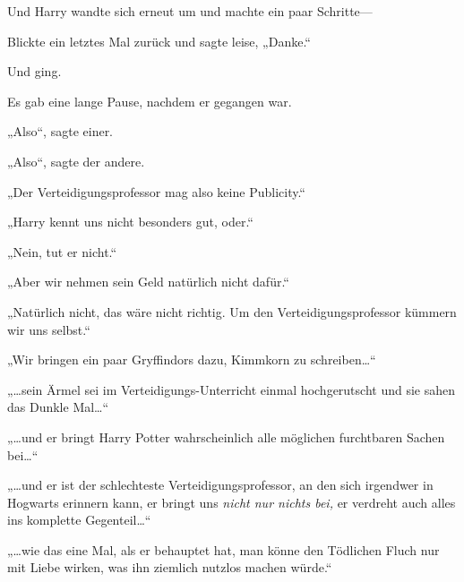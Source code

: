Und Harry wandte sich erneut um und machte ein paar Schritte—

Blickte ein letztes Mal zurück und sagte leise, „Danke.“

Und ging.

Es gab eine lange Pause, nachdem er gegangen war.

„Also“, sagte einer.

„Also“, sagte der andere.

„Der Verteidigungsprofessor mag also keine Publicity.“

„Harry kennt uns nicht besonders gut, oder.“

„Nein, tut er nicht.“

„Aber wir nehmen sein Geld natürlich nicht dafür.“

„Natürlich nicht, das wäre nicht richtig. Um den Verteidigungsprofessor kümmern wir uns selbst.“

„Wir bringen ein paar Gryffindors dazu, Kimmkorn zu schreiben…“

„…sein Ärmel sei im Verteidigungs-Unterricht einmal hochgerutscht und sie sahen das Dunkle Mal…“

„…und er bringt Harry Potter wahrscheinlich alle möglichen furchtbaren Sachen bei…“

„…und er ist der schlechteste Verteidigungsprofessor, an den sich irgendwer in Hogwarts erinnern kann, er bringt uns \emph{nicht nur nichts bei,} er verdreht auch alles ins komplette Gegenteil…“

„…wie das eine Mal, als er behauptet hat, man könne den Tödlichen Fluch nur mit Liebe wirken, was ihn ziemlich nutzlos machen würde.“

